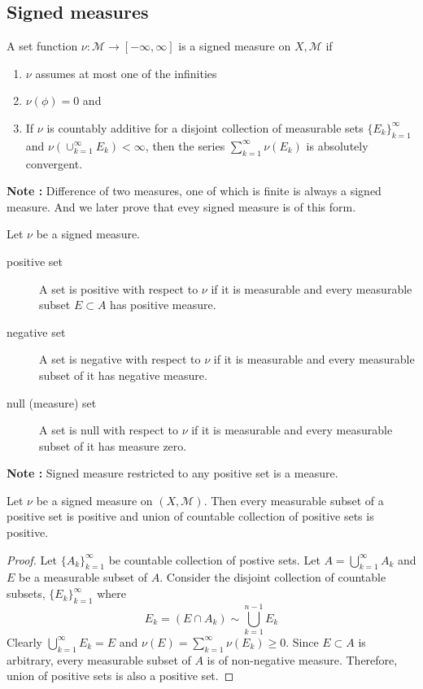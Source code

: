 \subsection{Signed measures}
\begin{definition}
	A set function $\nu : \mathcal{M} \to [-\infty,\infty]$ is a signed measure on $X,\mathcal{M}$ if
	\begin{enumerate}
		\item $\nu$ assumes at most one of the infinities
		\item $\nu(\phi) = 0$ and
		\item If $\nu$ is countably additive for a disjoint collection of measurable sets $\{ E_k \}_{k=1}^\infty$ and $\nu(\cup_{k=1}^\infty E_k) < \infty$, then the series $\sum_{k=1}^\infty \nu(E_k)$ is absolutely convergent.
	\end{enumerate}
\end{definition}
\textbf{Note : } Difference of two measures, one of which is finite is always a signed measure. And we later prove that evey signed measure is of this form.

\begin{definition}
	Let $\nu$ be a signed measure.
\begin{description}
	\item[positive set] A set is positive with respect to $\nu$ if it is measurable and every measurable subset $E \subset A$ has positive measure.
	\item[negative set] A set is negative with respect to $\nu$ if it is measurable and every measurable subset of it has negative measure.
	\item[null (measure) set] A set is null with respect to $\nu$ if it is measurable and every measurable subset of it has measure zero.
\end{description}
\end{definition}

\textbf{Note : } Signed measure restricted to any positive set is a measure.

\begin{theorem}
	Let $\nu$ be a signed measure on $(X,\mathcal{M})$.
	Then every measurable subset of a positive set is positive and union of countable collection of positive sets is positive.
\end{theorem}
\begin{proof}
	Let $\{ A_k \}_{k=1}^\infty$ be countable collection of postive sets.
	Let $\displaystyle A = \bigcup_{k=1}^\infty A_k$ and $E$ be a measurable subset of $A$.
	Consider the disjoint collection of countable subsets, $\{ E_k \}_{k=1}^\infty$ where
	\[ E_k = (E \cap A_k) \sim \bigcup_{k=1}^{n-1}E_k \]
	Clearly $\displaystyle \bigcup_{k=1}^\infty E_k = E$ and $\displaystyle \nu(E) = \sum_{k=1}^\infty \nu(E_k) \ge 0$.
	Since $E \subset A$ is arbitrary, every measurable subset of $A$ is of non-negative measure.
	Therefore, union of positive sets is also a positive set.
\end{proof}

